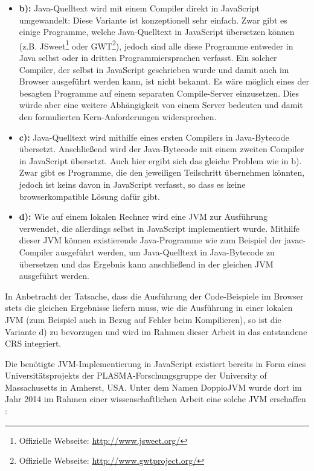 \begin{itemize}
    \item \textbf{b):} Java-Quelltext wird mit einem Compiler direkt in JavaScript umgewandelt: Diese Variante ist konzeptionell sehr einfach. Zwar gibt es einige Programme, welche Java-Quelltext in JavaScript übersetzen können (z.B. JSweet\footnote{Offizielle Webseite: \url{http://www.jsweet.org/}} oder GWT\footnote{Offizielle Webseite: \url{http://www.gwtproject.org/}}), jedoch sind alle diese Programme entweder in Java selbst oder in dritten Programmiersprachen verfasst. Ein solcher Compiler, der selbst in JavaScript geschrieben wurde und damit auch im Browser ausgeführt werden kann, ist nicht bekannt. Es wäre möglich eines der besagten Programme auf einem separaten Compile-Server einzusetzen. Dies würde aber eine weitere Abhängigkeit von einem Server bedeuten und damit den formulierten Kern-Anforderungen widersprechen.
    \item \textbf{c):} Java-Quelltext wird mithilfe eines ersten Compilers in Java-Bytecode übersetzt. Anschließend wird der Java-Bytecode mit einem zweiten Compiler in JavaScript übersetzt. Auch hier ergibt sich das gleiche Problem wie in b). Zwar gibt es Programme, die den jeweiligen Teilschritt übernehmen könnten, jedoch ist keins davon in JavaScript verfasst, so dass es keine browserkompatible Lösung dafür gibt.
    \item \textbf{d):} Wie auf einem lokalen Rechner wird eine JVM zur Ausführung verwendet, die allerdings selbst in JavaScript implementiert wurde. Mithilfe dieser JVM können existierende Java-Programme wie zum Beispiel der javac-Compiler ausgeführt werden, um Java-Quelltext in Java-Bytecode zu übersetzen und das Ergebnis kann anschließend in der gleichen JVM ausgeführt werden.
\end{itemize}

In Anbetracht der Tatsache, dass die Ausführung der Code-Beispiele im Browser stets die gleichen Ergebnisse liefern muss, wie die Ausführung in einer lokalen JVM (zum Beispiel auch in Bezug auf Fehler beim Kompilieren), so ist die Variante d) zu bevorzugen und wird im Rahmen dieser Arbeit in das entstandene CRS integriert.

Die benötigte JVM-Implementierung in JavaScript existiert bereits in Form eines Universitätsprojekts der PLASMA-Forschungsgruppe der University of Massachusetts in Amherst, USA. Unter dem Namen DoppioJVM wurde dort im Jahr 2014 im Rahmen einer wissenschaftlichen Arbeit eine solche JVM erschaffen \cite[S. 8]{paper:doppio}:

